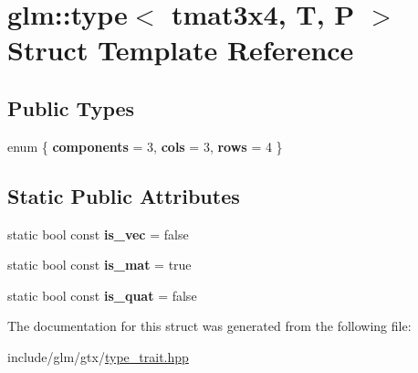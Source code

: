 \hypertarget{structglm_1_1type_3_01tmat3x4_00_01T_00_01P_01_4}{}\section{glm\+:\+:type$<$ tmat3x4, T, P $>$ Struct Template Reference}
\label{structglm_1_1type_3_01tmat3x4_00_01T_00_01P_01_4}
\subsection*{Public Types}
\begin{DoxyCompactItemize}
\item 
\mbox{\label{structglm_1_1type_3_01tmat3x4_00_01T_00_01P_01_4_ad6981833fccb071a5867d7eabbb7ff0c}} 
enum \{ {\bfseries components} = 3, 
{\bfseries cols} = 3, 
{\bfseries rows} = 4
 \}
\end{DoxyCompactItemize}
\subsection*{Static Public Attributes}
\begin{DoxyCompactItemize}
\item 
\mbox{\label{structglm_1_1type_3_01tmat3x4_00_01T_00_01P_01_4_a0f8889ba1c42a20724de490aedd7869b}} 
static bool const {\bfseries is\+\_\+vec} = false
\item 
\mbox{\label{structglm_1_1type_3_01tmat3x4_00_01T_00_01P_01_4_a352d4feea2dff7acf213b9caf1a80ff2}} 
static bool const {\bfseries is\+\_\+mat} = true
\item 
\mbox{\label{structglm_1_1type_3_01tmat3x4_00_01T_00_01P_01_4_a29f350bebcffa210f4cf19fadce9093f}} 
static bool const {\bfseries is\+\_\+quat} = false
\end{DoxyCompactItemize}


The documentation for this struct was generated from the following file\+:\begin{DoxyCompactItemize}
\item 
include/glm/gtx/\hyperlink{type__trait_8hpp}{type\+\_\+trait.\+hpp}\end{DoxyCompactItemize}
